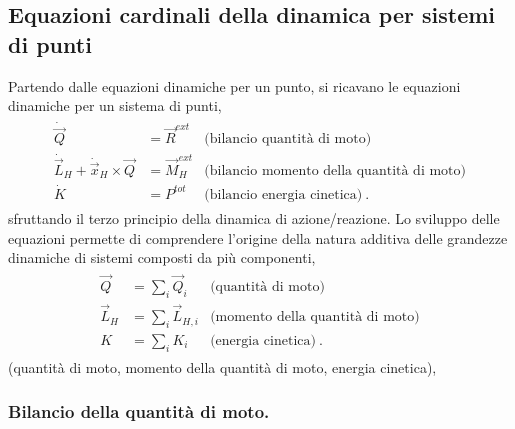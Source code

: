 \documentclass[letterpaper,10pt,italian]{jupyterBook}
\begin{document}
\subsection{Equazioni cardinali della dinamica per sistemi di punti}
\label{\detokenize{ch/mechanics/dynamics-eom-proof-points:equazioni-cardinali-della-dinamica-per-sistemi-di-punti}}\label{\detokenize{ch/mechanics/dynamics-eom-proof-points:physics-hs-mechanics-dynamics-eom-points}}\label{\detokenize{ch/mechanics/dynamics-eom-proof-points::doc}}
\sphinxAtStartPar
Partendo dalle equazioni dinamiche per un punto, si ricavano le equazioni dinamiche per un sistema di punti,
\begin{equation*}
\begin{split}\begin{aligned}
 \dot{\vec{Q}} & = \vec{R}^{ext} & \text{(bilancio quantità di moto)} \\
 \dot{\vec{L}}_H + \dot{\vec{x}}_H \times \vec{Q} & = \vec{M}_H^{ext} & \text{(bilancio momento della quantità di moto)} \\
 \dot{K} & = P^{tot} & \text{(bilancio energia cinetica)} \ .
\end{aligned}\end{split}
\end{equation*}
\sphinxAtStartPar
sfruttando il terzo principio della dinamica di azione/reazione. Lo sviluppo delle equazioni permette di comprendere l’origine della natura additiva delle grandezze dinamiche di sistemi composti da più componenti,
\begin{equation*}
\begin{split}\begin{aligned}
\vec{Q}     & = \sum_i \vec{Q}_i     & \text{(quantità di moto)}\\
\vec{L}_{H} & = \sum_i \vec{L}_{H,i} & \text{(momento della quantità di moto)}\\
 K          & = \sum_i K_i           & \text{(energia cinetica)} \ .
\end{aligned}\end{split}
\end{equation*}
\sphinxAtStartPar
(quantità di moto, momento della quantità di moto, energia cinetica),
\subsubsection*{Bilancio della quantità di moto.}
\end{document}
